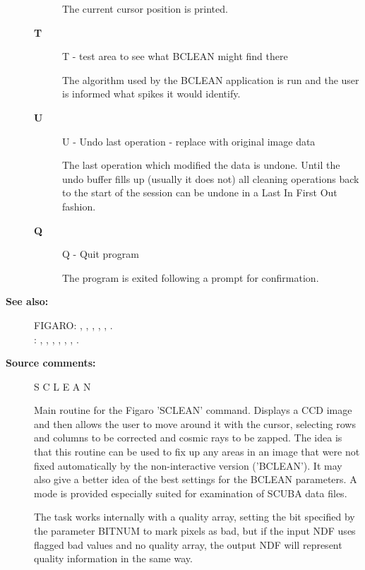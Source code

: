 \begin{description}
\begin{description}
    The current cursor position is printed.
\item [\textbf{T}]
 T - test area to see what BCLEAN might find there

    The algorithm used by the BCLEAN application is run and the user
    is informed what spikes it would identify.
\item [\textbf{U}]
 U - Undo last operation - replace with original image data

    The last operation which modified the data is undone.  Until the
    undo buffer fills up (usually it does not) all cleaning operations
    back to the start of the session can be undone in a Last In First
    Out fashion.
\item [\textbf{Q}]
 Q - Quit program

    The program is exited following a prompt for confirmation.
\end{description}

\item [\textbf{See also:}]
FIGARO: , , , , , .\\
: , , , , , , .\\

\item [\textbf{Source comments:}]
\begin{terminalv}
 S C L E A N

 Main routine for the Figaro 'SCLEAN' command.  Displays
 a CCD image and then allows the user to move around it with
 the cursor, selecting rows and columns to be corrected and
 cosmic rays to be zapped.  The idea is that this routine can
 be used to fix up any areas in an image that were not fixed
 automatically by the non-interactive version ('BCLEAN').  It
 may also give a better idea of the best settings for the
 BCLEAN parameters.  A mode is provided especially suited for
 examination of SCUBA data files.

 The task works internally with a quality array, setting the
 bit specified by the parameter BITNUM to mark pixels as bad,
 but if the input NDF uses flagged bad values and no quality
 array, the output NDF will represent quality information in
 the same way.


\end{terminalv}
\end{description}
